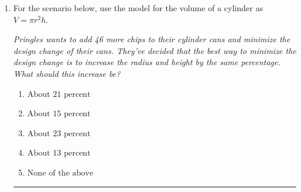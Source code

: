 \documentclass[14pt]{extbook}
\newcommand{\litem}[1]{\item#1\hspace*{-1cm}\rule{\textwidth}{0.4pt}}
\begin{document}
\begin{enumerate}
{\begin{enumerate}[label=\Alph*.]
\end{enumerate} }
\litem{
For the scenario below, use the model for the volume of a cylinder as $V = \pi r^2 h$.
\begin{center}
    \textit{ Pringles wants to add 46 \text{percent} more chips to their cylinder cans and minimize the design change of their cans. They've decided that the best way to minimize the design change is to increase the radius and height by the same percentage. What should this increase be? }
\end{center}
\begin{enumerate}[label=\Alph*.]
\item \( \text{About } 21 \text{ percent} \)
\item \( \text{About } 15 \text{ percent} \)
\item \( \text{About } 23 \text{ percent} \)
\item \( \text{About } 13 \text{ percent} \)
\item \( \text{None of the above} \)

\end{enumerate} }
\end{enumerate}
\end{document}
